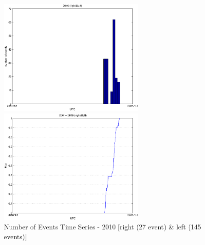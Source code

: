 \documentclass[a4paper,11pt]{article}
\begin{document}
\begin{figure}[htbp]
\begin{minipage}{0.55\hsize}
\centering
\includegraphics[width=7.3cm, clip]{histTime2010.eps}
\end{minipage}
\begin{minipage}{0.55\hsize}
 \centering
\includegraphics[width=7.3cm, clip]{CDFTime2010.eps}
\end{minipage}
\caption{Number of Events Time Series - 2010 [right (27 event) \& left (145 events)]}
\end{figure}
\end{document}
